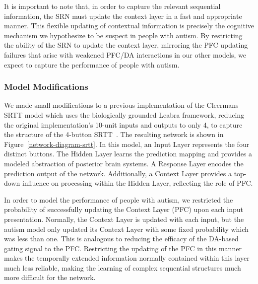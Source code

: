 It is important to note that, in order to capture the relevant sequential information, the SRN must update the context layer in a fast and appropriate manner.  This flexible updating of contextual information is precisely the cognitive mechanism we hypothesize to be suspect in people with autism.  By restricting the ability of the SRN to update the context layer, mirroring the PFC updating failures that arise with weakened PFC/DA interactions in our other models, we expect to capture the performance of people with autism.

\subsubsection{Model Modifications}
We made small modifications to a previous implementation of the Cleermans SRTT model which uses the biologically grounded Leabra framework, reducing the original implementation's 10-unit inputs and outputs to only 4, to capture the structure of the 4-button SRTT~\cite{OReillyRC:2000:Computational}.  The resulting network is shown in Figure~\ref{network-diagram-srtt}.  In this model, an Input Layer represents the four distinct buttons.  The Hidden Layer learns the prediction mapping and provides a modeled abstraction of posterior brain systems.  A Response Layer encodes the prediction output of the network.  Additionally, a Context Layer provides a top-down influence on processing within the Hidden Layer, reflecting the role of PFC.

In order to model the performance of people with autism, we restricted the probability of successfully updating the Context Layer (PFC) upon each input presentation.  Normally, the Context Layer is updated with each input, but the autism model only updated its Context Layer with some fixed probability which was less than one.  This is analogous to reducing the efficacy of the DA-based gating signal to the PFC.  Restricting the updating of the PFC in this manner makes the temporally extended information normally contained within this layer much less reliable, making the learning of complex sequential structures much more difficult for the network.

